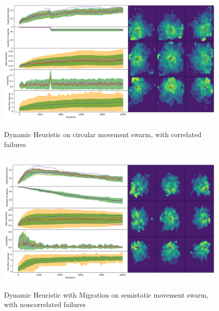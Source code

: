 \documentclass{UoYCSproject}
\begin{document}
\begin{figure}[htb]
\label{fig:circle_movement_con2}
\begin{center}
\centering
\includegraphics[height=7cm]{"./Dynamic_Heuristic/Circle_Move_con.png"}
\caption{Dynamic Heuristic on circular movement swarm, with correlated failures}
\end{center}
\end{figure}


\begin{figure}[htb]
\label{fig:static_movement_non3}
\begin{center}
\centering
\includegraphics[height=7cm]{"./Dynamic_Migration/Static_Move_non.png"}
\caption{Dynamic Heuristic with Migration on semi\-static movement swarm, with non\-correlated failures}
\end{center}
\end{figure}
\end{document}
